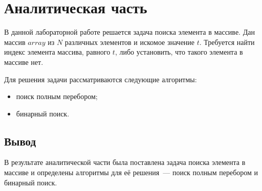 \chapter{Аналитическая часть}
В данной лабораторной работе решается задача поиска элемента в массиве. Дан массив $array$ из $N$ различных элементов и искомое значение $t$. Требуется найти индекс элемента массива, равного $t$, либо установить, что такого элемента в массиве нет.

Для решения задачи рассматриваются следующие алгоритмы:
\begin{itemize}
	\item поиск полным перебором;
	\item бинарный поиск.
\end{itemize}

\section{Вывод}
В результате аналитической части была поставлена задача поиска элемента в массиве и определены алгоритмы для её решения~--- поиск полным перебором и бинарный поиск.
